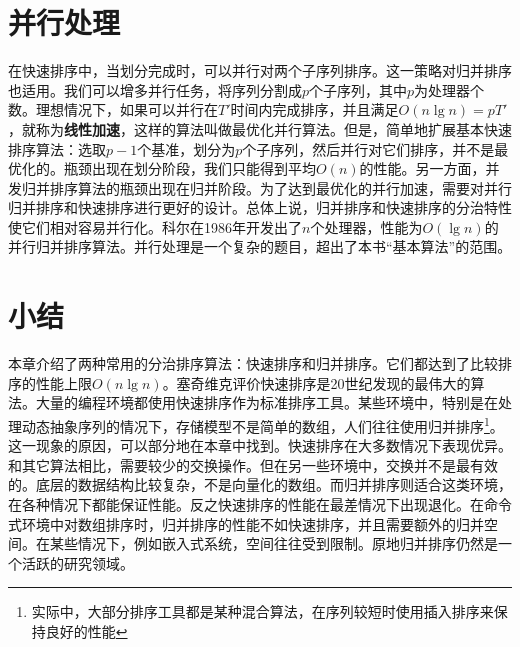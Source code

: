 \documentclass[b5paper]{ctexart}
\begin{document}
\begin{Answer}[ref = {ex:pairwise-fold}]
\end{Answer}

\section{并行处理}

在快速排序中，当划分完成时，可以并行对两个子序列排序。这一策略对归并排序也适用。我们可以增多并行任务，将序列分割成$p$个子序列，其中$p$为处理器个数。理想情况下，如果可以并行在$T'$时间内完成排序，并且满足$O(n \lg n) = p T'$，就称为\textbf{线性加速}，这样的算法叫做最优化并行算法。但是，简单地扩展基本快速排序算法：选取$p-1$个基准，划分为$p$个子序列，然后并行对它们排序，并不是最优化的。瓶颈出现在划分阶段，我们只能得到平均$O(n)$的性能。另一方面，并发归并排序算法的瓶颈出现在归并阶段。为了达到最优化的并行加速，需要对并行归并排序和快速排序进行更好的设计。总体上说，归并排序和快速排序的分治特性使它们相对容易并行化。科尔在1986年开发出了$n$个处理器，性能为$O(\lg n)$的并行归并排序算法\cite{para-msort}。并行处理是一个复杂的题目，超出了本书“基本算法”的范围\cite{para-msort}\cite{para-qsort}。

\section{小结}

本章介绍了两种常用的分治排序算法：快速排序和归并排序。它们都达到了比较排序的性能上限$O(n \lg n)$。塞奇维克评价快速排序是20世纪发现的最伟大的算法。大量的编程环境都使用快速排序作为标准排序工具。某些环境中，特别是在处理动态抽象序列的情况下，存储模型不是简单的数组，人们往往使用归并排序\footnote{实际中，大部分排序工具都是某种混合算法，在序列较短时使用插入排序来保持良好的性能}。这一现象的原因，可以部分地在本章中找到。快速排序在大多数情况下表现优异。和其它算法相比，需要较少的交换操作。但在另一些环境中，交换并不是最有效的。底层的数据结构比较复杂，不是向量化的数组。而归并排序则适合这类环境，在各种情况下都能保证性能。反之快速排序的性能在最差情况下出现退化。在命令式环境中对数组排序时，归并排序的性能不如快速排序，并且需要额外的归并空间。在某些情况下，例如嵌入式系统，空间往往受到限制。原地归并排序仍然是一个活跃的研究领域。
\end{document}
